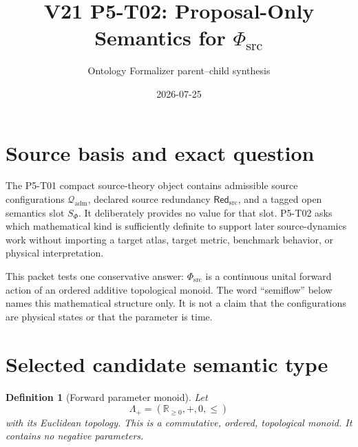 \documentclass[11pt]{article}
\title{V21 P5-T02: Proposal-Only Semantics for \(\Phi_{\mathrm{src}}\)}
\author{Ontology Formalizer parent--child synthesis}
\date{2026-07-25}
\newcommand{\Qadm}{\mathcal Q_{\mathrm{adm}}}
\newcommand{\Red}{\mathsf{Red}_{\mathrm{src}}}
\newcommand{\PhiSrc}{\Phi_{\mathrm{src}}}
\newcommand{\Lam}{\Lambda_+}
\newtheorem{definition}{Definition}
\begin{document}
\maketitle

\begin{center}
\end{center}

\section{Source basis and exact question}

The P5-T01 compact source-theory object contains admissible source
configurations \(\Qadm\), declared source redundancy \(\Red\), and a tagged
open semantics slot \(S_\Phi\). It deliberately provides no value for that
slot. P5-T02 asks which mathematical kind is sufficiently definite to support
later source-dynamics work without importing a target atlas, target metric,
benchmark behavior, or physical interpretation.

This packet tests one conservative answer: \(\PhiSrc\) is a continuous unital
forward action of an ordered additive topological monoid. The word
``semiflow'' below names this mathematical structure only. It is not a claim
that the configurations are physical states or that the parameter is time.

\section{Selected candidate semantic type}

\begin{definition}[Forward parameter monoid]
Let
\[
  \Lam=(\mathbb R_{\geq 0},+,0,\leq)
\]
with its Euclidean topology. This is a commutative, ordered, topological
monoid. It contains no negative parameters.
\end{definition}
\end{document}
